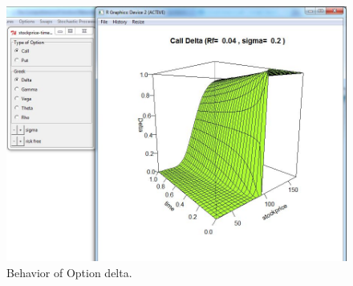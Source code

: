 \documentclass{article}
\begin{document}
\begin{figure}
\centering
\includegraphics[width=1\textwidth]{delta.jpg}
\caption[]{Behavior of Option delta.}
\label{Fig:nativeplotdelta}
\end{figure}
\end{document}
